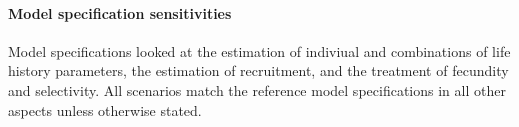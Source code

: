 \documentclass[11pt,
  english,
  a4paper,
]{article}
\begin{document}
\leavevmode\tagmcend\tagstructend\par


\hypertarget{model-specification-sensitivities}{%
\paragraph{Model specification sensitivities}\label{model-specification-sensitivities}}

\leavevmode\tagmcend\tagstructend


Model specifications looked at the estimation of indiviual and combinations of life history parameters, the estimation of recruitment, and the treatment of fecundity and selectivity. All scenarios match the reference model specifications in all other aspects unless otherwise stated.

\leavevmode\tagmcend\tagstructend\par

\end{document}
